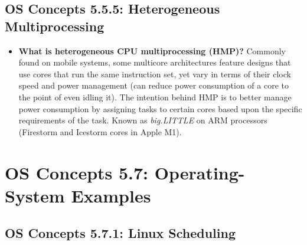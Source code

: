 \documentclass[12pt]{article}
\begin{document}
\subsection*{OS Concepts 5.5.5: Heterogeneous Multiprocessing}

\begin{itemize}
    \item \textbf{What is heterogeneous CPU multiprocessing (HMP)?} Commonly found on mobile systems, some multicore architectures feature designs that use cores that run the same instruction set, yet vary in terms of their clock speed and power management (can reduce power consumption of a core to the point of even idling it). The intention behind HMP is to better manage power consumption by assigning tasks to certain cores based upon the specific requirements of the task. Known as \textit{big.LITTLE} on ARM processors (Firestorm and Icestorm cores in Apple M1).
\end{itemize}

\section*{OS Concepts 5.7: Operating-System Examples}

\subsection*{OS Concepts 5.7.1: Linux Scheduling}
\end{document}
